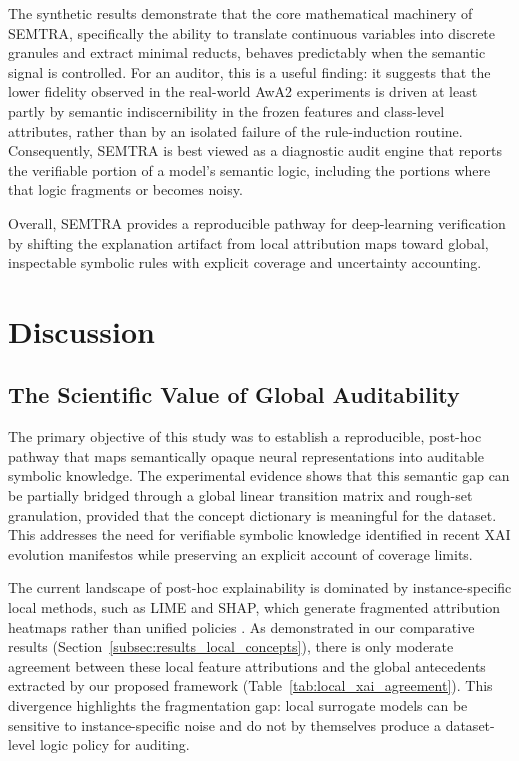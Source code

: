 \documentclass[make,article,submit,pdftex,moreauthors]{Definitions/mdpi}
\begin{document}
The synthetic results demonstrate that the core mathematical machinery of SEMTRA, specifically the ability to translate continuous variables into discrete granules and extract minimal reducts, behaves predictably when the semantic signal is controlled. For an auditor, this is a useful finding: it suggests that the lower fidelity observed in the real-world AwA2 experiments is driven at least partly by semantic indiscernibility in the frozen features and class-level attributes, rather than by an isolated failure of the rule-induction routine. Consequently, SEMTRA is best viewed as a diagnostic audit engine that reports the verifiable portion of a model's semantic logic, including the portions where that logic fragments or becomes noisy.

Overall, SEMTRA provides a reproducible pathway for deep-learning verification by shifting the explanation artifact from local attribution maps toward global, inspectable symbolic rules with explicit coverage and uncertainty accounting.

\section{Discussion}
\label{sec:discussion}

\subsection{The Scientific Value of Global Auditability}
\label{subsec:scientific_value}

The primary objective of this study was to establish a reproducible, post-hoc pathway that maps semantically opaque neural representations into auditable symbolic knowledge. The experimental evidence shows that this semantic gap can be partially bridged through a global linear transition matrix and rough-set granulation, provided that the concept dictionary is meaningful for the dataset. This addresses the need for verifiable symbolic knowledge identified in recent XAI evolution manifestos \cite{Longo2024XAI} while preserving an explicit account of coverage limits.

The current landscape of post-hoc explainability is dominated by instance-specific local methods, such as LIME and SHAP, which generate fragmented attribution heatmaps rather than unified policies \cite{Salih2025SHAPLIME}. As demonstrated in our comparative results (Section~\ref{subsec:results_local_concepts}), there is only moderate agreement between these local feature attributions and the global antecedents extracted by our proposed framework (Table~\ref{tab:local_xai_agreement}). This divergence highlights the fragmentation gap: local surrogate models can be sensitive to instance-specific noise and do not by themselves produce a dataset-level logic policy for auditing.
\end{document}
